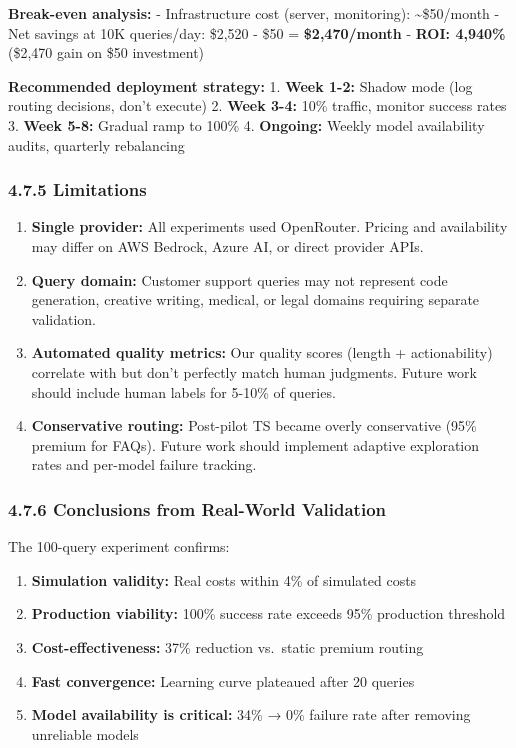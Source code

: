 \documentclass[
  11pt,
]{article}
\providecommand{\tightlist}{%
  \setlength{\itemsep}{0pt}\setlength{\parskip}{0pt}}
\begin{document}
\textbf{Break-even analysis:} - Infrastructure cost (server,
monitoring): \textasciitilde\$50/month - Net savings at 10K queries/day:
\$2,520 - \$50 = \textbf{\$2,470/month} - \textbf{ROI: 4,940\%} (\$2,470
gain on \$50 investment)

\textbf{Recommended deployment strategy:} 1. \textbf{Week 1-2:} Shadow
mode (log routing decisions, don't execute) 2. \textbf{Week 3-4:} 10\%
traffic, monitor success rates 3. \textbf{Week 5-8:} Gradual ramp to
100\% 4. \textbf{Ongoing:} Weekly model availability audits, quarterly
rebalancing

\hypertarget{limitations}{%
\subsubsection{4.7.5 Limitations}\label{limitations}}

\begin{enumerate}
\def\labelenumi{\arabic{enumi}.}
\item
  \textbf{Single provider:} All experiments used OpenRouter. Pricing and
  availability may differ on AWS Bedrock, Azure AI, or direct provider
  APIs.
\item
  \textbf{Query domain:} Customer support queries may not represent code
  generation, creative writing, medical, or legal domains requiring
  separate validation.
\item
  \textbf{Automated quality metrics:} Our quality scores (length +
  actionability) correlate with but don't perfectly match human
  judgments. Future work should include human labels for 5-10\% of
  queries.
\item
  \textbf{Conservative routing:} Post-pilot TS became overly
  conservative (95\% premium for FAQs). Future work should implement
  adaptive exploration rates and per-model failure tracking.
\end{enumerate}

\hypertarget{conclusions-from-real-world-validation}{%
\subsubsection{4.7.6 Conclusions from Real-World
Validation}\label{conclusions-from-real-world-validation}}

The 100-query experiment confirms:

\begin{enumerate}
\def\labelenumi{\arabic{enumi}.}
\tightlist
\item
  \textbf{Simulation validity:} Real costs within 4\% of simulated costs
\item
  \textbf{Production viability:} 100\% success rate exceeds 95\%
  production threshold
\item
  \textbf{Cost-effectiveness:} 37\% reduction vs.~static premium routing
\item
  \textbf{Fast convergence:} Learning curve plateaued after 20 queries
\item
  \textbf{Model availability is critical:} 34\% → 0\% failure rate after
  removing unreliable models
\end{enumerate}
\end{document}
